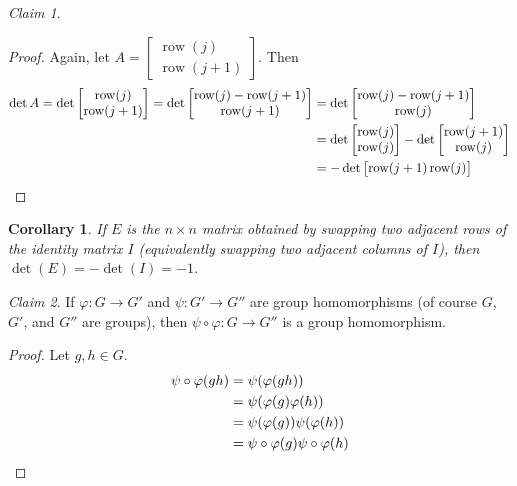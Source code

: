 \documentclass[12pt,letterpaper,DIV=11,final]{scrartcl}
\theoremstyle{plain}
\newtheorem{corollary}{Corollary}
\theoremstyle{definition}
\theoremstyle{remark}
\newtheorem{claim}{Claim}
\DeclareMathOperator{\row}{row}
\begin{document}
\begin{claim}
  \begin{proof}
    Again, let $A = \begin{bmatrix}
      \row(j) \\
      \row(j + 1)
    \end{bmatrix}$.
    Then
    \begin{align*}
      \det A = \det \begin{bmatrix}
        \row(j) \\
        \row(j + 1)
      \end{bmatrix} = \det%
      \begin{bmatrix}
        \row(j) - \row(j + 1) \\
        \row(j + 1)
      \end{bmatrix} &= \det%
      \begin{bmatrix}
        \row(j) - \row(j + 1) \\
        \row(j)
      \end{bmatrix} \\
      &= \det%
      \begin{bmatrix}
        \row(j) \\
        \row(j)
      \end{bmatrix} - \det%
      \begin{bmatrix}
        \row(j + 1) \\
        \row(j)
      \end{bmatrix} \\
      &= - \det
      \begin{bmatrix}
        \row(j + 1)
        \row(j)
      \end{bmatrix} \qedhere
    \end{align*}
  \end{proof}
\end{claim}

\begin{corollary}
  If $E$ is the $n \times n$ matrix obtained by swapping two adjacent rows of the identity matrix $I$ (equivalently swapping two adjacent columns of $I$), then $\det(E) = -\det(I) = -1$.
\end{corollary}

\begin{claim}
  If $\varphi : G \to G'$ and $\psi : G' \to G''$ are group homomorphisms (of course $G$, $G'$, and $G''$ are groups), then $\psi \circ \varphi : G \to G''$ is a group homomorphism.

  \begin{proof}
    Let $g, h \in G$.
    \begin{align*}
      \psi \circ \varphi(gh) &= \psi(\varphi(gh)) \\
                             &= \psi(\varphi(g) \varphi(h)) \\
                             &= \psi(\varphi(g)) \psi(\varphi(h)) \\
                             &= \psi \circ \varphi(g) \psi \circ \varphi(h) \qedhere
    \end{align*}
  \end{proof}
\end{claim}
\end{document}
